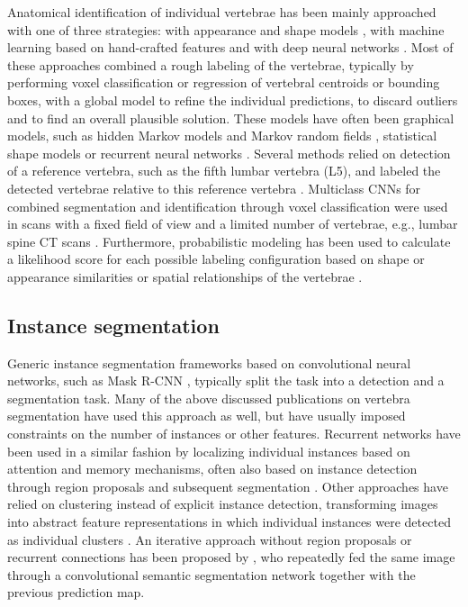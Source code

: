 \documentclass[authoryear,5p,final,times]{elsarticle}
\begin{document}
    Anatomical identification of individual vertebrae has been mainly approached with one of three strategies: with appearance and shape models \citep{Klinder2009,Glocker2012,Cai2015}, with machine learning based on hand-crafted features \citep{Chu2015,Glocker2012,Glocker2013,Major2013,Kelm2013,Suzani2015,Bromiley2016} and with deep neural networks \citep{Cai2016,Chen2015,Forsberg2017,Liao2018,Yang2017,Yang2017b,Janssens2018,Sekuboyina2017,Lessmann2018b}. Most of these approaches combined a rough labeling of the vertebrae, typically by performing voxel classification or regression of vertebral centroids or bounding boxes, with a global model to refine the individual predictions, to discard outliers and to find an overall plausible solution. These models have often been graphical models, such as hidden Markov models \citep{Chu2015,Glocker2012} and Markov random fields \citep{Major2013}, statistical shape models \citep{Bromiley2016,Suzani2015,Chen2015} or recurrent neural networks \citep{Yang2017b,Liao2018}. Several methods relied on detection of a reference vertebra, such as the fifth lumbar vertebra (L5), and labeled the detected vertebrae relative to this reference vertebra \citep{Cai2016,Forsberg2017,Lessmann2018b}. Multiclass CNNs for combined segmentation and identification through voxel classification were used in scans with a fixed field of view and a limited number of vertebrae, e.g., lumbar spine CT scans \citep{Sekuboyina2017,Janssens2018}. Furthermore, probabilistic modeling has been used to calculate a likelihood score for each possible labeling configuration based on shape or appearance similarities or spatial relationships of the vertebrae \citep{Glocker2013,Kelm2013,Chen2015,Klinder2009}.
                
    \subsection{Instance segmentation}
    
    Generic instance segmentation frameworks based on convolutional neural networks, such as Mask R-CNN \citep{He2017}, typically split the task into a detection and a segmentation task. Many of the above discussed publications on vertebra segmentation have used this approach as well, but have usually imposed constraints on the number of instances or other features. Recurrent networks have been used in a similar fashion by localizing individual instances based on attention and memory mechanisms, often also based on instance detection through region proposals and subsequent segmentation \citep{Stewart2016,RomeraParedes2016,Li2016,Ren2017}. Other approaches have relied on clustering instead of explicit instance detection, transforming images into abstract feature representations in which individual instances were detected as individual clusters \citep{Uhrig2016,DeBrabandere2017,Liang2018,Novotny2018}. An iterative approach without region proposals or recurrent connections has been proposed by \citet{Li2016}, who repeatedly fed the same image through a convolutional semantic segmentation network together with the previous prediction map.
            
\end{document}
